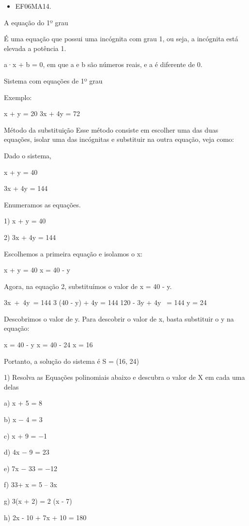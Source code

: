 
\begin{itemize} 
\item  EF06MA14.
\end{itemize}

A equação do 1º grau~

É uma equação que possui uma incógnita com grau 1, ou seja, a incógnita
está elevada a potência 1.

a·x + b = 0, em que a e b são números reais, e a é diferente de 0.

Sistema com equações de 1º grau

Exemplo:

x + y = 20 3x + 4y = 72

Método da substituição Esse método consiste em escolher uma das duas
equações, isolar uma das incógnitas e substituir na outra equação, veja
como:

Dado o sistema,

x + y = 40

3x + 4y = 144

Enumeramos as equações.

1) x + y = 40

2) 3x + 4y = 144

Escolhemos a primeira equação e isolamos o x:

x + y = 40 x = 40 - y

Agora, na equação 2, substituímos o valor de x = 40 - y.

3x~+~4y~= 144 3 (40 - y) + 4y = 144 120 - 3y + 4y~ = 144 y = 24

Descobrimos o valor de y. Para descobrir o valor de x, basta substituir
o y na equação:

x = 40 - y x = 40 - 24 x = 16

Portanto, a solução do sistema é S = (16, 24)


1) Resolva as Equações polinomiais abaixo e descubra o valor de X em
cada uma delas

a) x + 5 = 8

b) x − 4 = 3

c) x + 9 = −1

d) 4x − 9 = 23

e) 7x − 33 = −12

f) 33+ x = 5 -- 3x

g) 3(x + 2) = 2 (x - 7)

h) 2x - 10 + 7x + 10 = 180

